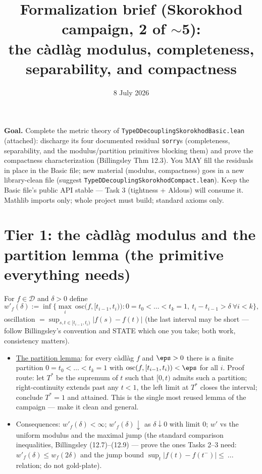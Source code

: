 \documentclass[11pt]{article}
\title{Formalization brief (Skorokhod campaign, 2 of $\sim$5):\\
the c\`adl\`ag modulus, completeness, separability, and compactness}
\date{8 July 2026}
\theoremstyle{plain}
\theoremstyle{remark}
\newcommand{\D}{\mathcal D}\newcommand{\norm}[1]{\lVert #1\rVert}
\begin{document}
\maketitle

\noindent\textbf{Goal.} Complete the metric theory of
\texttt{TypeDDecouplingSkorokhodBasic.lean} (attached): discharge its four
documented residual \texttt{sorry}s (completeness, separability, and the
modulus/partition primitives blocking them) and prove the compactness
characterization (Billingsley Thm 12.3). You MAY fill the residuals in place
in the Basic file; new material (modulus, compactness) goes in a new
library-clean file (suggest \texttt{TypeDDecouplingSkorokhodCompact.lean}).
Keep the Basic file's public API stable --- Task 3 (tightness + Aldous) will
consume it. Mathlib imports only; whole project must build; standard axioms
only.

\section*{Tier 1: the c\`adl\`ag modulus and the partition lemma (the
primitive everything needs)}

For $f\in\D$ and $\delta>0$ define
\[
  w'_f(\delta):=\inf\Big\{\max_i\ \mathrm{osc}\big(f,[t_{i-1},t_i)\big):
  0=t_0<\dots<t_k=1,\ t_i-t_{i-1}>\delta\ \forall i<k\Big\},
\]
oscillation $=\sup_{s,t\in[t_{i-1},t_i)}|f(s)-f(t)|$ (the last interval may be
short --- follow Billingsley's convention and STATE which one you take; both
work, consistency matters).
\begin{itemize}
\item[(a)] \underline{The partition lemma}: for every c\`adl\`ag $f$ and
$\eps>0$ there is a finite partition $0=t_0<\dots<t_k=1$ with
$\mathrm{osc}(f,[t_{i-1},t_i))<\eps$ for all $i$. Proof route: let $T^*$ be
the supremum of $t$ such that $[0,t)$ admits such a partition; right-continuity
extends past any $t<1$, the left limit at $T^*$ closes the interval; conclude
$T^*=1$ and attained. This is the single most reused lemma of the campaign ---
make it clean and general.
\item[(b)] Consequences: $w'_f(\delta)<\infty$; $w'_f(\delta)\downarrow$ as
$\delta\downarrow0$ with limit $0$; $w'$ vs the uniform modulus and the
maximal jump (the standard comparison inequalities, Billingsley (12.7)--(12.9)
--- prove the ones Tasks 2--3 need: $w'_f(\delta)\le w_f(2\delta)$ and the
jump bound $\sup_t|f(t)-f(t^-)|\le\ ...$ relation; do not gold-plate).
\end{itemize}
\end{document}
